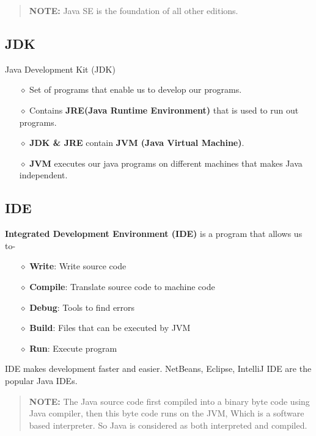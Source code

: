 \begin{quotation}
	\textbf{NOTE:} Java SE is the foundation of all other editions.
\end{quotation}


\subsection{JDK}
Java Development Kit (JDK)
\begin{itemize}
	\item[{\LARGE $\diamond$}] Set of programs that enable us to develop our programs.
	
	\item[{\LARGE $\diamond$}] Contains \textbf{JRE(Java Runtime Environment)} that is used to run out programs.
	
	\item[{\LARGE $\diamond$}] \textbf{JDK \& JRE} contain \textbf{JVM (Java Virtual Machine)}.
	
	\item[{\LARGE $\diamond$}] \textbf{JVM} executes our java programs on different machines that makes Java independent.
\end{itemize}

\subsection{IDE}
\textbf{Integrated Development Environment (IDE)} is a program that allows us to-
\begin{itemize}
	\item[{\LARGE $\diamond$}] \textbf{Write}: Write source code
	\item[{\LARGE $\diamond$}] \textbf{Compile}: Translate source code to machine code
	\item[{\LARGE $\diamond$}] \textbf{Debug}: Tools to find errors
	\item[{\LARGE $\diamond$}] \textbf{Build}: Files that can be executed by JVM
	\item[{\LARGE $\diamond$}] \textbf{Run}: Execute program
\end{itemize}
IDE makes development faster and easier. NetBeans, Eclipse, IntelliJ IDE are the popular Java IDEs.
\begin{quotation}
	\textbf{NOTE:} The Java source code first compiled into a binary byte code using Java compiler, then this byte code runs on the JVM, Which is a software based interpreter. So Java is considered as both interpreted and compiled.
\end{quotation} 


